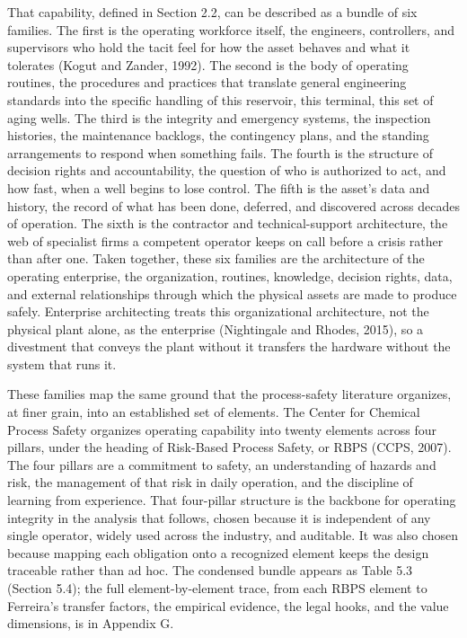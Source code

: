 That capability, defined in Section 2.2, can be described as a bundle of
six families. The first is the operating workforce itself, the
engineers, controllers, and supervisors who hold the tacit feel for how
the asset behaves and what it tolerates (Kogut and Zander, 1992). The
second is the body of operating routines, the procedures and practices
that translate general engineering standards into the specific handling
of this reservoir, this terminal, this set of aging wells. The third is
the integrity and emergency systems, the inspection histories, the
maintenance backlogs, the contingency plans, and the standing
arrangements to respond when something fails. The fourth is the
structure of decision rights and accountability, the question of who is
authorized to act, and how fast, when a well begins to lose control. The
fifth is the asset's data and history, the record of what has been done,
deferred, and discovered across decades of operation. The sixth is the
contractor and technical-support architecture, the web of specialist
firms a competent operator keeps on call before a crisis rather than
after one. Taken together, these six families are the architecture of
the operating enterprise, the organization, routines, knowledge,
decision rights, data, and external relationships through which the
physical assets are made to produce safely. Enterprise architecting
treats this organizational architecture, not the physical plant alone,
as the enterprise (Nightingale and Rhodes, 2015), so a divestment that
conveys the plant without it transfers the hardware without the system
that runs it.

These families map the same ground that the process-safety literature
organizes, at finer grain, into an established set of elements. The
Center for Chemical Process Safety organizes operating capability into
twenty elements across four pillars, under the heading of Risk-Based
Process Safety, or RBPS (CCPS, 2007). The four pillars are a commitment
to safety, an understanding of hazards and risk, the management of that
risk in daily operation, and the discipline of learning from experience.
That four-pillar structure is the backbone for operating integrity in
the analysis that follows, chosen because it is independent of any
single operator, widely used across the industry, and auditable. It was
also chosen because mapping each obligation onto a recognized element
keeps the design traceable rather than ad hoc. The condensed bundle
appears as Table 5.3 (Section 5.4); the full element-by-element trace,
from each RBPS element to Ferreira's transfer factors, the empirical
evidence, the legal hooks, and the value dimensions, is in Appendix G.

